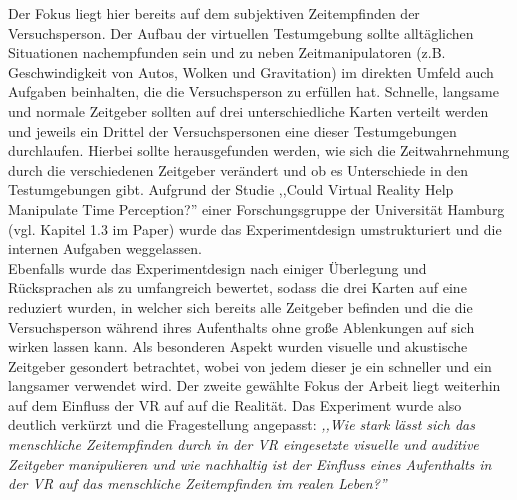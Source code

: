 \documentclass{Bericht}
\begin{document}
	 Der Fokus liegt hier bereits auf dem subjektiven Zeitempfinden der Versuchsperson. Der Aufbau der virtuellen Testumgebung sollte alltäglichen Situationen nachempfunden sein und zu neben Zeitmanipulatoren (z.B. Geschwindigkeit von Autos, Wolken und Gravitation) im direkten Umfeld auch Aufgaben beinhalten, die die Versuchsperson zu erfüllen hat. Schnelle, langsame und normale Zeitgeber sollten auf drei unterschiedliche Karten verteilt werden und jeweils ein Drittel der Versuchspersonen eine dieser Testumgebungen durchlaufen. Hierbei sollte herausgefunden werden, wie sich die Zeitwahrnehmung durch die verschiedenen Zeitgeber verändert und ob es Unterschiede in den Testumgebungen gibt. Aufgrund der Studie ,,Could Virtual Reality Help Manipulate Time Perception?'' einer Forschungsgruppe der Universität Hamburg (vgl. Kapitel 1.3 im Paper) wurde das Experimentdesign umstrukturiert und die internen Aufgaben weggelassen.\\
Ebenfalls wurde das Experimentdesign nach einiger Überlegung und Rücksprachen als zu umfangreich bewertet, sodass die drei Karten auf eine reduziert wurden, in welcher sich bereits alle Zeitgeber befinden und die die Versuchsperson während ihres Aufenthalts ohne große Ablenkungen auf sich wirken lassen kann. Als besonderen Aspekt wurden visuelle und akustische Zeitgeber gesondert betrachtet, wobei von jedem dieser je ein schneller und ein langsamer verwendet wird. Der zweite gewählte Fokus der Arbeit liegt weiterhin auf dem Einfluss der VR auf auf die Realität.  
Das Experiment wurde also deutlich verkürzt und die Fragestellung angepasst: \textit{,,Wie stark lässt sich das menschliche
Zeitempfinden durch in der VR eingesetzte visuelle und auditive Zeitgeber manipulieren und
wie nachhaltig ist der Einfluss eines Aufenthalts in der VR auf das menschliche Zeitempfinden
im realen Leben?''} 
 
\end{document}
